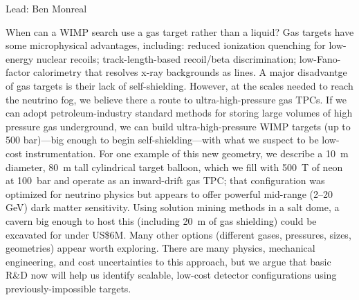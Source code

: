Lead: Ben Monreal

When can a WIMP search use a gas target rather than a liquid?  Gas targets have some microphysical advantages, including: reduced ionization quenching for low-energy nuclear recoils; track-length-based recoil/beta discrimination; low-Fano-factor calorimetry that resolves x-ray backgrounds as lines. A major disadvantge of gas targets is their lack of self-shielding.  However, at the scales needed to reach the neutrino fog, we believe there a route to ultra-high-pressure gas TPCs.  If we can adopt petroleum-industry standard methods for storing large volumes of high pressure gas underground, we can build ultra-high-pressure WIMP targets (up to 500 bar)---big enough to begin self-shielding---with what we suspect to be low-cost instrumentation.  For one example of this new geometry, we describe a 10~m diameter, 80~m tall cylindrical target balloon, which we fill with 500~T of neon at 100~bar and operate as an inward-drift gas TPC; that configuration was optimized for neutrino physics but appears to offer powerful mid-range (2--20 GeV) dark matter sensitivity.  Using solution mining methods in a salt dome, a cavern big enough to host this (including 20~m of gas shielding) could be excavated for under US\$6M.  Many other options (different gases, pressures, sizes, geometries) appear worth exploring.  There are many physics, mechanical engineering, and cost uncertainties to this approach, but we argue that basic R\&D now will help us identify scalable, low-cost detector configurations using previously-impossible targets. 